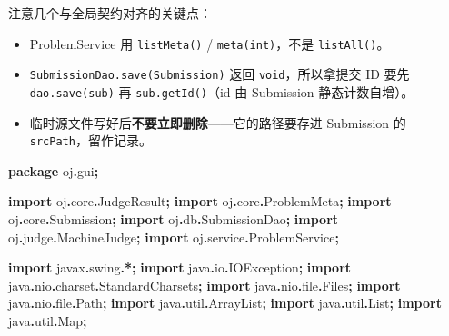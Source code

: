 \documentclass[
  11pt,
]{ctexart}
\newenvironment{Shaded}{\begin{snugshade}}{\end{snugshade}}
\newcommand{\ImportTok}[1]{#1}
\newcommand{\KeywordTok}[1]{\textcolor[rgb]{0.13,0.29,0.53}{\textbf{#1}}}
\newcommand{\OperatorTok}[1]{\textcolor[rgb]{0.81,0.36,0.00}{\textbf{#1}}}
\providecommand{\tightlist}{%
  \setlength{\itemsep}{0pt}\setlength{\parskip}{0pt}}
\begin{document}
注意几个与全局契约对齐的关键点：

\begin{itemize}
\tightlist
\item
  ProblemService 用 \texttt{listMeta()} / \texttt{meta(int)}，不是
  \texttt{listAll()}。
\item
  \texttt{SubmissionDao.save(Submission)} 返回 \texttt{void}，所以拿提交
  ID 要先 \texttt{dao.save(sub)} 再 \texttt{sub.getId()}（id 由
  Submission 静态计数自增）。
\item
  临时源文件写好后\textbf{不要立即删除}------它的路径要存进 Submission
  的 \texttt{srcPath}，留作记录。
\end{itemize}

\begin{Shaded}
\begin{Highlighting}[]
\KeywordTok{package}\ImportTok{ oj}\OperatorTok{.}\ImportTok{gui}\OperatorTok{;}

\KeywordTok{import} \ImportTok{oj}\OperatorTok{.}\ImportTok{core}\OperatorTok{.}\ImportTok{JudgeResult}\OperatorTok{;}
\KeywordTok{import} \ImportTok{oj}\OperatorTok{.}\ImportTok{core}\OperatorTok{.}\ImportTok{ProblemMeta}\OperatorTok{;}
\KeywordTok{import} \ImportTok{oj}\OperatorTok{.}\ImportTok{core}\OperatorTok{.}\ImportTok{Submission}\OperatorTok{;}
\KeywordTok{import} \ImportTok{oj}\OperatorTok{.}\ImportTok{db}\OperatorTok{.}\ImportTok{SubmissionDao}\OperatorTok{;}
\KeywordTok{import} \ImportTok{oj}\OperatorTok{.}\ImportTok{judge}\OperatorTok{.}\ImportTok{MachineJudge}\OperatorTok{;}
\KeywordTok{import} \ImportTok{oj}\OperatorTok{.}\ImportTok{service}\OperatorTok{.}\ImportTok{ProblemService}\OperatorTok{;}

\KeywordTok{import} \ImportTok{javax}\OperatorTok{.}\ImportTok{swing}\OperatorTok{.*;}
\KeywordTok{import} \ImportTok{java}\OperatorTok{.}\ImportTok{io}\OperatorTok{.}\ImportTok{IOException}\OperatorTok{;}
\KeywordTok{import} \ImportTok{java}\OperatorTok{.}\ImportTok{nio}\OperatorTok{.}\ImportTok{charset}\OperatorTok{.}\ImportTok{StandardCharsets}\OperatorTok{;}
\KeywordTok{import} \ImportTok{java}\OperatorTok{.}\ImportTok{nio}\OperatorTok{.}\ImportTok{file}\OperatorTok{.}\ImportTok{Files}\OperatorTok{;}
\KeywordTok{import} \ImportTok{java}\OperatorTok{.}\ImportTok{nio}\OperatorTok{.}\ImportTok{file}\OperatorTok{.}\ImportTok{Path}\OperatorTok{;}
\KeywordTok{import} \ImportTok{java}\OperatorTok{.}\ImportTok{util}\OperatorTok{.}\ImportTok{ArrayList}\OperatorTok{;}
\KeywordTok{import} \ImportTok{java}\OperatorTok{.}\ImportTok{util}\OperatorTok{.}\ImportTok{List}\OperatorTok{;}
\KeywordTok{import} \ImportTok{java}\OperatorTok{.}\ImportTok{util}\OperatorTok{.}\ImportTok{Map}\OperatorTok{;}


\end{Highlighting}
\end{Shaded}
\end{document}
